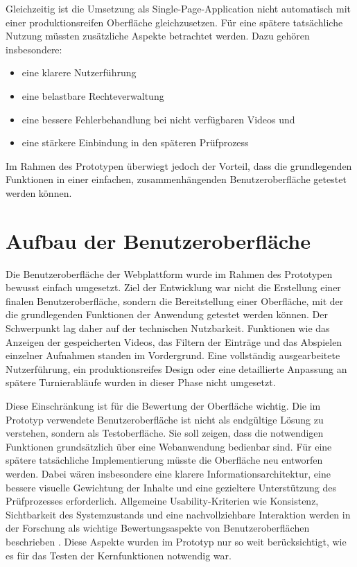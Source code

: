 Gleichzeitig ist die Umsetzung als Single-Page-Application nicht automatisch mit einer produktionsreifen Oberfläche gleichzusetzen. Für eine spätere tatsächliche Nutzung müssten zusätzliche Aspekte betrachtet werden. Dazu gehören insbesondere: 

\begin{itemize} 
    \item eine klarere Nutzerführung
    \item eine belastbare Rechteverwaltung
    \item eine bessere Fehlerbehandlung bei nicht verfügbaren Videos und 
    \item eine stärkere Einbindung in den späteren Prüfprozess
\end{itemize} 

Im Rahmen des Prototypen überwiegt jedoch der Vorteil, dass die grundlegenden Funktionen in einer einfachen, zusammenhängenden Benutzeroberfläche getestet werden können. 

\section{Aufbau der Benutzeroberfläche} \label{sec:web-ui} 

Die Benutzeroberfläche der Webplattform wurde im Rahmen des Prototypen bewusst einfach umgesetzt. Ziel der Entwicklung war nicht die Erstellung einer finalen Benutzeroberfläche, sondern die Bereitstellung einer Oberfläche, mit der die grundlegenden Funktionen der Anwendung getestet werden können. 
Der Schwerpunkt lag daher auf der technischen Nutzbarkeit. Funktionen wie das Anzeigen der gespeicherten Videos, das Filtern der Einträge und das Abspielen einzelner Aufnahmen standen im Vordergrund. Eine vollständig ausgearbeitete Nutzerführung, 
ein produktionsreifes Design oder eine detaillierte Anpassung an spätere Turnierabläufe wurden in dieser Phase nicht umgesetzt. 

Diese Einschränkung ist für die Bewertung der Oberfläche wichtig. Die im Prototyp verwendete Benutzeroberfläche ist nicht als endgültige Lösung zu verstehen, sondern als Testoberfläche. Sie soll zeigen, dass die notwendigen Funktionen grundsätzlich über eine Webanwendung bedienbar sind. 
Für eine spätere tatsächliche Implementierung müsste die Oberfläche neu entworfen werden. Dabei wären insbesondere eine klarere Informationsarchitektur, eine bessere visuelle Gewichtung der Inhalte und eine gezieltere Unterstützung des Prüfprozesses erforderlich. 
Allgemeine Usability-Kriterien wie Konsistenz, Sichtbarkeit des Systemzustands und eine nachvollziehbare Interaktion werden in der Forschung als wichtige Bewertungsaspekte von Benutzeroberflächen beschrieben \cite{quinones2018methodology}. Diese Aspekte wurden im Prototyp nur so weit berücksichtigt, 
wie es für das Testen der Kernfunktionen notwendig war. 

